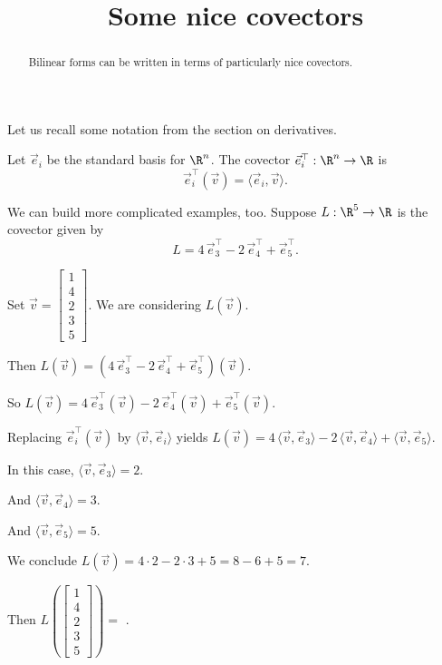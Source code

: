 \documentclass{ximera}
\title{Some nice covectors}
\begin{document}
\begin{abstract}
  Bilinear forms can be written in terms of particularly nice covectors.
\end{abstract}\maketitle	

Let us recall some notation from the section on derivatives.
	
Let $\vec{e}_i$ be the standard basis for $\R^n$.  The covector $\vec{e}_i^\top : \R^n \to \R$ is 
$$
\vec{e}_i^\top(\vec{v}) = \langle \vec{e}_i, \vec{v} \rangle.
$$
\begin{question}
  We can build more complicated examples, too.  Suppose $L : \R^5 \to \R$ is the covector given by
  $$
  L = 4 \, \vec{e}_3^\top - 2 \, \vec{e}_4^\top + \vec{e}_5^\top.
  $$
  \begin{solution}
    \begin{hint}
      Set $\vec{v} = \begin{bmatrix} 1 \\ 4 \\ 2 \\ 3 \\ 5 \end{bmatrix}$.  We are considering $L(\vec{v})$.
    \end{hint}
    \begin{hint}
      Then $L(\vec{v}) = (4 \, \vec{e}_3^\top - 2 \, \vec{e}_4^\top + \vec{e}_5^\top)(\vec{v})$.
    \end{hint}
    \begin{hint}
      So $L(\vec{v}) = 4 \, \vec{e}_3^\top(\vec{v}) - 2 \, \vec{e}_4^\top(\vec{v}) + \vec{e}_5^\top(\vec{v})$.
    \end{hint}
    \begin{hint}
      Replacing $\vec{e}_i^\top(\vec{v})$ by $\langle \vec{v}, \vec{e}_i \rangle$ yields $L(\vec{v}) = 4 \, \langle \vec{v}, \vec{e}_3 \rangle - 2 \, \langle \vec{v}, \vec{e}_4 \rangle + \langle \vec{v}, \vec{e}_5 \rangle$.
    \end{hint}
    \begin{hint}
      In this case, $\langle \vec{v}, \vec{e}_3 \rangle = 2$.
    \end{hint}
    \begin{hint}
      And $\langle \vec{v}, \vec{e}_4 \rangle = 3$.
    \end{hint}
    \begin{hint}
      And $\langle \vec{v}, \vec{e}_5 \rangle = 5$.
    \end{hint}
    \begin{hint}
      We conclude $L(\vec{v}) = 4 \cdot 2 - 2 \cdot 3 + 5 = 8 - 6 + 5 = 7$.
    \end{hint}
    Then $L\left( \begin{bmatrix} 1 \\ 4 \\ 2 \\ 3 \\ 5 \end{bmatrix} \right) = $ .
  \end{solution}


\end{question}
\end{document}
